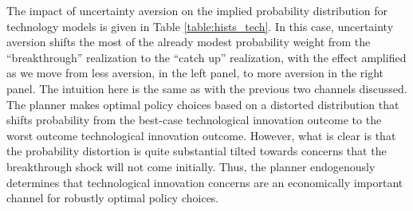 \documentclass[12pt]{article}
\begin{document}

The impact of uncertainty aversion on the implied probability distribution for technology models is given in Table \ref{table:hists_tech}. In this case, uncertainty aversion shifts the most of the already modest probability weight from the ``breakthrough'' realization to the ``catch up'' realization, with the effect amplified as we move from less aversion, in the left panel, to more aversion in the right panel. The intuition here is the same as with the previous two channels discussed. The planner makes optimal policy choices based on a distorted distribution that shifts probability from the best-case technological innovation outcome to the worst outcome technological innovation outcome. However, what is clear is that the probability distortion is quite substantial tilted towards concerns that the breakthrough shock will not come initially. Thus, the planner endogenously determines that technological innovation concerns are an economically important channel for robustly optimal policy choices.
\end{document}
